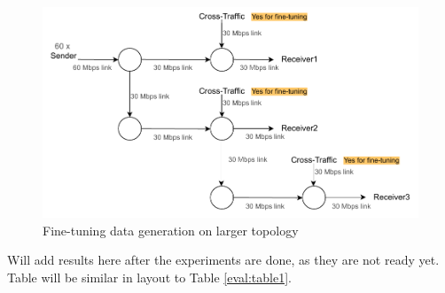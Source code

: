\begin{figure}[h]
  \begin{center}
    \includegraphics[scale=0.7]{figures/complex_topo.pdf}
    \caption{Fine-tuning data generation on larger topology}
    \label{fig:topo_ft_big}
  \end{center}
\end{figure}

Will add results here after the experiments are done, as they are not ready yet. Table will be similar  in layout to Table \ref{eval:table1}.



